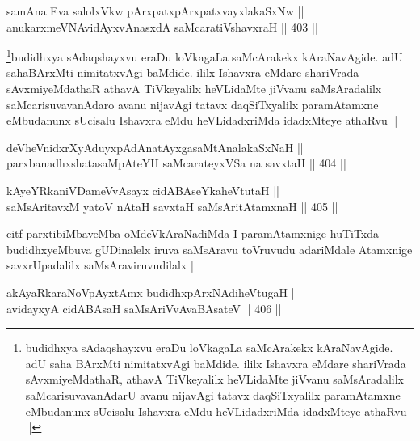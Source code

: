 
\begin{shl}
samAna Eva salolxVkw pArxpatxpArxpatxvayxlakaSxNw || \\
anukarxmeVNAvidAyxvAnasxdA saMcaratiVshavxraH ||  403 ||  
\end{shl}

\begin{artha}
\footnote{budidhxya sAdaqshayxvu eraDu loVkagaLa saMcArakekx kAraNavAgide. adU saha BArxMti nimitatxvAgi baMdide. ililx Ishavxra eMdare shariVrada sAvxmiyeMdathaR, athavA TiVkeyalilx heVLidaMte jiVvanu saMsAradalilx saMcarisuvavanAdarU avanu nijavAgi tatavx daqSiTxyalilx paramAtamxne eMbudanunx sUcisalu Ishavxra eMdu heVLidadxriMda idadxMteye athaRvu ||}budidhxya sAdaqshayxvu eraDu loVkagaLa saMcArakekx kAraNavAgide. adU sahaBArxMti nimitatxvAgi baMdide. ililx Ishavxra eMdare shariVrada sAvxmiyeMdathaR athavA TiVkeyalilx heVLidaMte jiVvanu saMsAradalilx saMcarisuvavanAdaro avanu nijavAgi tatavx daqSiTxyalilx paramAtamxne eMbudanunx sUcisalu Ishavxra eMdu heVLidadxriMda idadxMteye athaRvu ||
\end{artha}

\begin{shl}
deVheVnidxrXyAduyxpAdAnatAyxgasaMtAnalakaSxNaH || \\
parxbanadhxshatasaMpAteYH saMcarateyxVSa na savxtaH ||  404 ||  
\end{shl}	



\begin{shl}
kAyeYRkaniVDameVvAsayx cidABAseYkaheVtutaH || \\
saMsAritavxM yatoV nAtaH savxtaH saMsAritA\s \s tamxnaH ||  405 || 
\end{shl}

\begin{artha}
citf parxtibiMbaveMba oMdeVkAraNadiMda I paramAtamxnige huTiTxda budidhxyeMbuva gUDinalelx iruva saMsAravu toVruvudu adariMdale Atamxnige savxrUpadalilx saMsAraviruvudilalx ||
\end{artha}


\begin{shl}
akAyaRkaraNoV\s pAyxtAmx budidhxpArxNAdiheVtugaH || \\
avidayxyA cidABAsaH saMsAriVvAvaBAsateV ||  406 || 
\end{shl}

